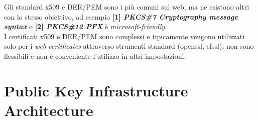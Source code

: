 \begin{flushleft}
    Gli standard x509 e DER/PEM sono i più comuni sul web, ma ne esistono altri con lo stesso obiettivo, ad esempio \textbf{[1] \textit{PKCS\#7 Cryptography message syntax}} o \textbf{[2] \textit{PKCS\#12 PFX}} è \textit{microsoft-friendly}. \\
    I certificati x509 e DER/PEM sono complessi e tipicamente vengono utilizzati solo per i \textit{web certificates} attraverso strumenti standard (openssl, cfssl); non sono flessibili e non è conveniente l'utilizzo in altri impostazioni.

\end{flushleft}

\newpage

\section{Public Key Infrastructure Architecture}

